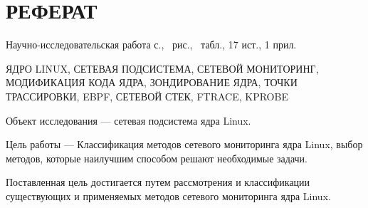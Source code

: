 \section*{\centering РЕФЕРАТ}
\setcounter{page}{2}

Научно-исследовательская работа \pageref{LastPage} с., \totalfigures\ рис., \totaltables\ табл., 17 ист., 1 прил.

ЯДРО LINUX, СЕТЕВАЯ ПОДСИСТЕМА, СЕТЕВОЙ МОНИТОРИНГ, МОДИФИКАЦИЯ КОДА ЯДРА, ЗОНДИРОВАНИЕ ЯДРА, ТОЧКИ ТРАССИРОВКИ, EBPF, СЕТЕВОЙ СТЕК, FTRACE, KPROBE 

Объект исследования — сетевая подсистема ядра Linux.

Цель работы --- Классификация методов сетевого мониторинга ядра Linux, выбор методов, которые наилучшим способом решают необходимые задачи.

Поставленная цель достигается путем рассмотрения и классификации существующих и применяемых методов сетевого мониторинга ядра Linux.